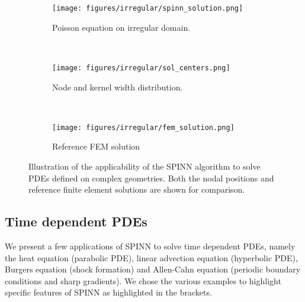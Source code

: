 \documentclass[12pt]{article}
\newcommand{\new}[1]{#1}
\begin{document}
\begin{figure}
\begin{subfigure}{0.32\textwidth}
\centering
\texttt{[image: figures/irregular/spinn\_solution.png]}
\caption{Poisson equation on irregular domain.}
\label{fig:poisson2d_irregular}
\end{subfigure}
~
\begin{subfigure}{0.32\textwidth}
\texttt{[image: figures/irregular/sol\_centers.png]}
\caption{Node and kernel width distribution.}
\label{fig:poisson2d_irregular_nodes}
\end{subfigure}
~
\begin{subfigure}{0.32\textwidth}
\texttt{[image: figures/irregular/fem\_solution.png]}
\caption{Reference FEM solution}
\label{fig:poisson2d_irregular_fem}
\end{subfigure}
\caption{Illustration of the applicability of the SPINN algorithm to solve PDEs defined on complex geometries. Both the nodal positions and reference finite element solutions are shown for comparison.}
\label{fig:spinn_pde2d_irred_dom}
\end{figure}

\subsection{Time dependent PDEs}
\new{We present a few applications of SPINN to solve time dependent PDEs, namely the heat equation (parabolic PDE), linear advection equation (hyperbolic PDE), Burgers equation (shock formation) and Allen-Cahn equation (periodic boundary conditions and sharp gradients). We chose the various examples to highlight specific features of SPINN as highlighted in the brackets.}
\end{document}
